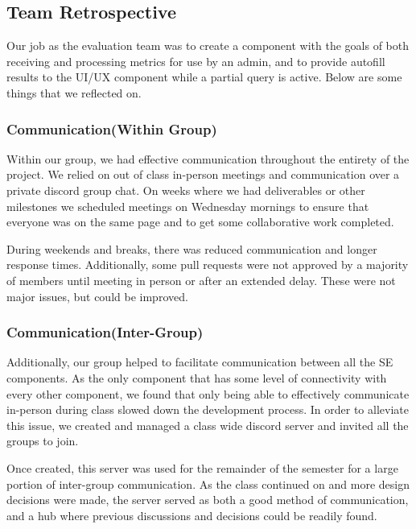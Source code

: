 \subsection*{Team Retrospective}
Our job as the evaluation team was to create a component with the goals of both receiving and processing metrics for use by an admin, and to provide autofill results to the UI/UX component while a partial query is active. Below are some things that we reflected on.

\subsubsection*{Communication(Within Group)}
Within our group, we had effective communication throughout the entirety of the project. We relied on out of class in-person meetings and communication over a private discord group chat. On weeks where we had deliverables or other milestones we scheduled meetings on Wednesday mornings to ensure that everyone was on the same page and to get some collaborative work completed. 

\medskip

During weekends and breaks, there was reduced communication and longer response times. Additionally, some pull requests were not approved by a majority of members until meeting in person or after an extended delay. These were not major issues, but could be improved.

\smallskip\subsubsection*{Communication(Inter-Group)}
Additionally, our group helped to facilitate communication between all the SE components. As the only component that has some level of connectivity with every other component, we found that only being able to effectively communicate in-person during class slowed down the development process. In order to alleviate this issue, we created and managed a class wide discord server and invited all the groups to join. 

\medskip

Once created, this server was used for the remainder of the semester for a large portion of inter-group communication. As the class continued on and more design decisions were made, the server served as both a good method of communication, and a hub where previous discussions and decisions could be readily found. 

\smallskip

